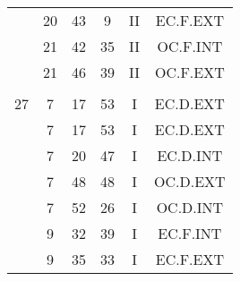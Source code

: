 \documentclass[12pt, a4paper]{article}
\begin{document}
\begin{multicols}{3}
{\begin{tabular}{c c c c c c}
	 	 	 	 & 20 & 43 & 9 & II & EC.F.EXT\\%
	 	 	 	 & 21 & 42 & 35 & II & OC.F.INT\\%
	 	 	 	 & 21 & 46 & 39 & II & OC.F.EXT\\%
	 	 	 	 & & & & & \\%
	 	 	 	27 & 7 & 17 & 53 & I & EC.D.EXT\\%
	 	 	 	 & 7 & 17 & 53 & I & EC.D.EXT\\%
	 	 	 	 & 7 & 20 & 47 & I & EC.D.INT\\%
	 	 	 	 & 7 & 48 & 48 & I & OC.D.EXT\\%
	 	 	 	 & 7 & 52 & 26 & I & OC.D.INT\\%
	 	 	 	 & 9 & 32 & 39 & I & EC.F.INT\\%
	 	 	 	 & 9 & 35 & 33 & I & EC.F.EXT\\%
	 	 \end{tabular}
 	}
\end{multicols}
\end{document}
